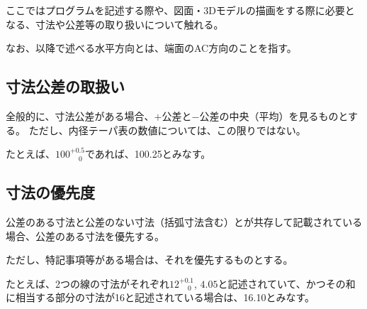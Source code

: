 
ここではプログラムを記述する際や、図面・3Dモデルの描画をする際に必要となる、寸法や公差等の取り扱いについて触れる。

なお、以降で述べる水平方向とは、端面のAC方向のことを指す。





\subsection{寸法公差の取扱い}
全般的に、寸法公差がある場合、$+$公差と$-$公差の中央（平均）を見るものとする。
ただし、内径テーパ表の数値については、この限りではない。
\begin{hosoku}
たとえば、$100^{+0.5}_{\phantom -0}$であれば、100.25とみなす。
\end{hosoku}


\subsection{寸法の優先度}
公差のある寸法と公差のない寸法（括弧寸法含む）とが共存して記載されている場合、公差のある寸法を優先する。

ただし、特記事項等がある場合は、それを優先するものとする。
\begin{hosoku}
たとえば、2つの線の寸法がそれぞれ$12^{+0.1}_{\phantom -0}$, $4.05$と記述されていて、かつその和に相当する部分の寸法が16と記述されている場合は、16.10とみなす。
\end{hosoku}



